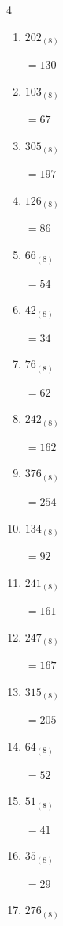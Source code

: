 \begin{multicols}{4}
\begin{enumerate}
  \item $202_{(8)}$

        $=130$

  \item $103_{(8)}$

        $=67$

  \item $305_{(8)}$

        $=197$

  \item $126_{(8)}$

        $=86$

\columnbreak %

  \item $66_{(8)}$

        $=54$

  \item $42_{(8)}$

        $=34$

  \item $76_{(8)}$

        $=62$

  \item $242_{(8)}$

        $=162$

  \item $376_{(8)}$

        $=254$

  \item $134_{(8)}$

        $=92$

  \item $241_{(8)}$

        $=161$

  \item $247_{(8)}$

        $=167$

  \item $315_{(8)}$

        $=205$

  \item $64_{(8)}$

        $=52$

  \item $51_{(8)}$

        $=41$

  \item $35_{(8)}$

        $=29$

  \item $276_{(8)}$


\end{enumerate}
\end{multicols}
